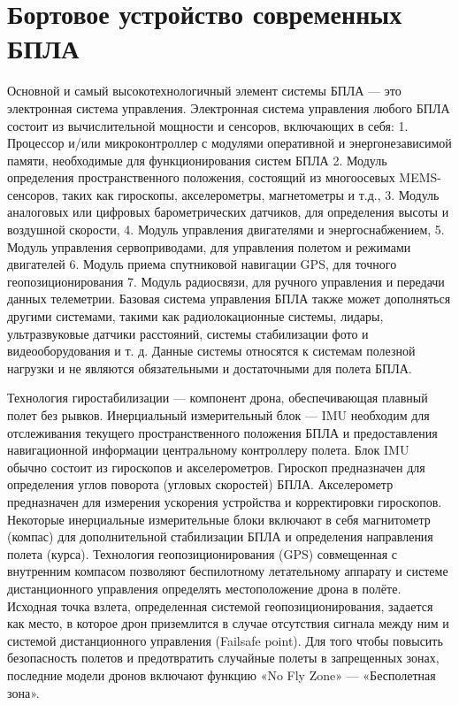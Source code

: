 \documentclass[nir, och, master]{SCWorks}
\begin{document}
\section{Бортовое устройство современных БПЛА}

Основной и самый высокотехнологичный элемент системы БПЛА — это электронная система управления.
Электронная система управления любого БПЛА состоит из вычислительной мощности и сенсоров, включающих в себя:
1. Процессор и/или микроконтроллер с модулями оперативной и энергонезависимой памяти, необходимые
для функционирования систем БПЛА
2. Модуль определения пространственного положения,
состоящий из многоосевых MEMS-сенсоров, таких как
гироскопы, акселерометры, магнетометры и т.д.,
3. Модуль аналоговых или цифровых барометрических
датчиков, для определения высоты
и воздушной скорости,
4. Модуль управления двигателями и энергоснабжением,
5. Модуль управления сервоприводами, для управления
полетом и режимами двигателей
6. Модуль приема спутниковой навигации GPS, для точного геопозиционирования
7. Модуль радиосвязи, для ручного управления и передачи данных телеметрии.
Базовая система управления БПЛА также может дополняться другими системами, такими как радиолокационные системы, лидары, ультразвуковые датчики расстояний, системы стабилизации фото и видеооборудования
и т. д. Данные системы относятся к системам полезной
нагрузки и не являются обязательными и достаточными
для полета БПЛА.

Технология гиростабилизации — компонент дрона,
обеспечивающая плавный полет без рывков. Инерциальный измерительный блок — IMU необходим для отслеживания текущего пространственного положения
БПЛА и предоставления навигационной информации
центральному контроллеру полета. Блок IMU обычно
состоит из гироскопов и акселерометров. Гироскоп
предназначен для определения углов поворота (угловых скоростей) БПЛА. Акселерометр предназначен
для измерения ускорения устройства и корректировки
гироскопов. Некоторые инерциальные измерительные блоки включают в себя магнитометр (компас) для
дополнительной стабилизации БПЛА и определения
направления полета (курса).
Технология геопозиционирования (GPS) совмещенная с внутренним компасом позволяют беспилотному летательному аппарату и системе дистанционного
управления определять местоположение дрона в полёте. Исходная точка взлета, определенная системой
геопозиционирования, задается как место, в которое
дрон приземлится в случае отсутствия сигнала между
ним и системой дистанционного управления (Failsafe
point). Для того чтобы повысить безопасность полетов
и предотвратить случайные полеты в запрещенных зонах, последние модели дронов включают функцию «No
Fly Zone» — «Бесполетная зона».
\end{document}
